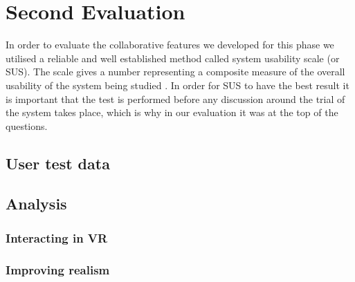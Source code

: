 \section{Second Evaluation}


In order to evaluate the collaborative features we developed for this phase we utilised a reliable and well established method called system usability scale (or SUS). The scale gives a number representing a composite measure of the overall usability of the system being studied \cite{brooke1996sus}. In order for SUS to have the best result it is important that the test is performed before any discussion around the trial of the system takes place, which is why in our evaluation it was at the  top of the questions. 


\subsection{User test data}




\subsection{Analysis}


\subsubsection{Interacting in VR}



\subsubsection{Improving realism}




\cleardoublepage